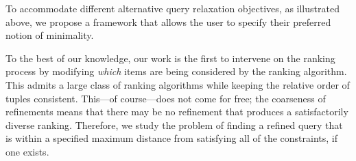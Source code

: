 \begin{example}
\end{example}

To accommodate different alternative query relaxation objectives, as illustrated above, we propose a framework that allows the user to specify their preferred notion of minimality. 

To the best of our knowledge, our work is the first to intervene on the ranking process by modifying {\it which} items are being considered by the ranking algorithm. This admits a large class of ranking algorithms while keeping the relative order of tuples consistent. This---of course---does not come for free; the coarseness of refinements means that there may be no refinement that produces a satisfactorily diverse ranking. Therefore, we study the problem of finding a refined query %
that is within a specified maximum distance from satisfying all of the constraints, if one exists. %








